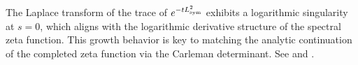 \begin{remark}
The Laplace transform of the trace of \( e^{-t L_{\mathrm{sym}}^2} \) exhibits a logarithmic singularity at \( s = 0 \), which aligns with the logarithmic derivative structure of the spectral zeta function. This growth behavior is key to matching the analytic continuation of the completed zeta function via the Carleman determinant. See  and .
\end{remark}
